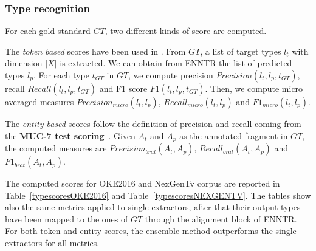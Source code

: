 \documentclass{llncs}
\newcommand{\tabref}[1]{\mbox{Table~\ref{#1}}}
\begin{document}
\subsubsection{Type recognition}
For each gold standard $GT$, two different kinds of score are computed.

The \textit{token based} scores have been used in \cite{fox1,fox2}. From $GT$, a list of target types $l_{t}$ with dimension $\left\vert{X}\right\vert$ is extracted. We can obtain from ENNTR the list of predicted types $l_{p}$. For each type $t_{GT}$ in $GT$, we compute precision $Precision(l_{t},l_{p},t_{GT})$, recall $Recall(l_{t},l_{p},t_{GT})$ and F1 score $F1(l_{t},l_{p},t_{GT})$. Then, we compute micro averaged measures $Precision_{micro}(l_{t},l_{p})$, $Recall_{micro}(l_{t},l_{p})$ and $F1_{micro}(l_{t},l_{p})$. \cite{sebastiani2002mltext}

The \textit{entity based} scores follow the definition of precision and recall coming from the \textbf{MUC-7 test scoring}~\cite{M98-1024}. Given $A_{t}$ and $A_{p}$ as the annotated fragment in $GT$, the computed measures are 
$Precision_{brat}(A_{t},A_{p})$, $Recall_{brat}(A_{t},A_{p})$ and 
$F1_{brat}(A_{t},A_{p})$. 


The computed scores for OKE2016 and NexGenTv corpus are reported in \tabref{typescoresOKE2016} and \tabref{typescoresNEXGENTV}. The tables show also the same metrics applied to single extractors, after that their output types have been mapped to the ones of $GT$ through the alignment block of ENNTR. For both token and entity scores, the ensemble method outperforms the single extractors for all metrics.
\end{document}

